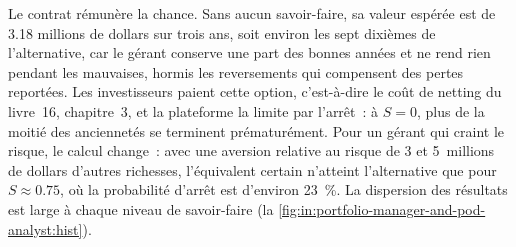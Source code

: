Le contrat rémunère la chance. Sans aucun savoir-faire, sa valeur espérée est de 3.18 millions de dollars sur trois ans, soit environ les sept dixièmes
de l'alternative, car le gérant conserve une part des bonnes années et ne rend rien pendant les mauvaises, hormis les reversements
qui compensent des pertes reportées. Les investisseurs paient cette option, c'est-à-dire le coût de netting du livre~16, chapitre~3, et la plateforme la
limite par l'arrêt~: à $S=0$, plus de la moitié des anciennetés se terminent prématurément. Pour un gérant qui craint le risque, le calcul change~:
avec une aversion relative au risque de 3 et 5~millions de dollars d'autres richesses, l'équivalent certain n'atteint l'alternative que
pour $S\approx0.75$, où la probabilité d'arrêt est d'environ 23~\%. La dispersion des résultats est large à chaque niveau de savoir-faire
(la \cref{fig:in:portfolio-manager-and-pod-analyst:hist}).

\begin{omfigure}

\label{fig:in:portfolio-manager-and-pod-analyst:stop}
\end{omfigure}

